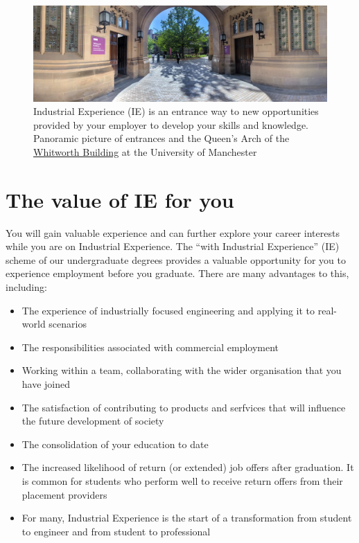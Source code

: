 \documentclass[
]{book}
\providecommand{\tightlist}{%
  \setlength{\itemsep}{0pt}\setlength{\parskip}{0pt}}
\begin{document}
\begin{figure}

{\centering \includegraphics[width=1\linewidth]{images/whitworth} 

}

\caption{Industrial Experience (IE) is an entrance way to new opportunities provided by your employer to develop your skills and knowledge. Panoramic picture of entrances and the Queen's Arch of the \href{https://en.wikipedia.org/wiki/Whitworth_Building}{Whitworth Building} at the University of Manchester}\label{fig:intro-fig}
\end{figure}



\section{The value of IE for you}\label{value}

You will gain valuable experience and can further explore your career interests while you are on Industrial Experience. \citep{experiencing, ucas, penney} The ``with Industrial Experience'' (IE) scheme of our undergraduate degrees provides a valuable opportunity for you to experience employment before you graduate. There are many advantages to this, including:

\begin{itemize}
\tightlist
\item
  The experience of industrially focused engineering and applying it to real-world scenarios
\item
  The responsibilities associated with commercial employment
\item
  Working within a team, collaborating with the wider organisation that you have joined
\item
  The satisfaction of contributing to products and serfvices that will influence the future development of society
\item
  The consolidation of your education to date
\item
  The increased likelihood of return (or extended) job offers after graduation. It is common for students who perform well to receive return offers from their placement providers
\item
  For many, Industrial Experience is the start of a transformation from student to engineer and from student to professional
\end{itemize}
\end{document}
